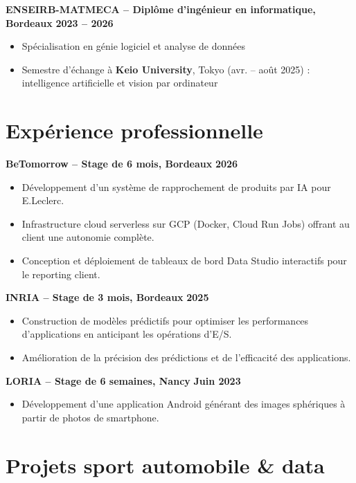 \documentclass[10pt,a4paper]{article}
\newcommand{\entryone}[2]{%
  \textbf{#1} \hfill \textbf{#2}\par\vspace{-2pt}
}
\begin{document}
\vspace{2pt}
\entryone{ENSEIRB-MATMECA -- Diplôme d'ingénieur en informatique, Bordeaux}{2023 -- 2026}
\begin{itemize}
  \item Spécialisation en génie logiciel et analyse de données
  \item Semestre d'échange à \textbf{Keio University}, Tokyo (avr. -- août 2025) : intelligence artificielle et vision par ordinateur
\end{itemize}

\section{Expérience professionnelle}

\entryone{BeTomorrow -- Stage de 6 mois, Bordeaux}{2026}
\begin{itemize}
  \item Développement d'un système de rapprochement de produits par IA pour E.Leclerc.
  \item Infrastructure cloud serverless sur GCP (Docker, Cloud Run Jobs) offrant au client une autonomie complète.
  \item Conception et déploiement de tableaux de bord Data Studio interactifs pour le reporting client.
\end{itemize}

\vspace{2pt}
\entryone{INRIA -- Stage de 3 mois, Bordeaux}{2025}
\begin{itemize}
  \item Construction de modèles prédictifs pour optimiser les performances d'applications en anticipant les opérations d'E/S.
  \item Amélioration de la précision des prédictions et de l'efficacité des applications.
\end{itemize}

\vspace{2pt}
\entryone{LORIA -- Stage de 6 semaines, Nancy}{Juin 2023}
\begin{itemize}
  \item Développement d'une application Android générant des images sphériques à partir de photos de smartphone.
\end{itemize}

\section{Projets sport automobile \& data}
\end{document}
